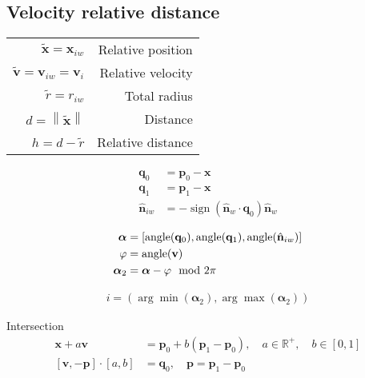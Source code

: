 \subsection{Velocity relative distance}

\begin{table}[H]
\centering
\begin{tabularx}{1.0\linewidth}{ R R }
\hline
\hline
$ \tilde{\mathbf{x}} = \mathbf{x}_{iw} $ & Relative position \\
$ \tilde{\mathbf{v}} = \mathbf{v}_{iw} = \mathbf{v}_{i} $ & Relative velocity \\
$ \tilde{r} = r_{iw} $ & Total radius \\
$ d = \left\|\tilde{\mathbf{x}}\right\| $ & Distance\\
$ h = d - \tilde{r} $ & Relative distance \\
\hline
\hline
\end{tabularx}
\end{table}


\begin{align}
\mathbf{q}_{0} &= \mathbf{p}_{0} - \mathbf{x} \\
\mathbf{q}_{1} &= \mathbf{p}_{1} - \mathbf{x} \\
\hat{\mathbf{n}}_{iw} &= - \operatorname{sign}(\hat{\mathbf{n}}_{w} \cdot \mathbf{q}_{0}) \hat{\mathbf{n}}_{w}
\end{align}


\begin{align}
\boldsymbol{\alpha} &= [\operatorname{angle}(\mathbf{q}_{0}), \operatorname{angle}(\mathbf{q}_{1}), \operatorname{angle}(\hat{\mathbf{n}}_{iw})] \\
\varphi &= \operatorname{angle}(\mathbf{v}) \\
\boldsymbol{\alpha}_{2} &= \boldsymbol{\alpha} - \varphi \mod{2 \pi}
\end{align}

\begin{align}
i = (\arg\min(\boldsymbol{\alpha}_{2}), \arg\max(\boldsymbol{\alpha}_{2}))
\end{align}

Intersection
\begin{align}
\mathbf{x} + a \mathbf{v} &= \mathbf{p}_0 + b (\mathbf{p}_1 - \mathbf{p}_0),\quad a \in \mathbb{R}^{+}, \quad b \in [0, 1]
\\
[\mathbf{v}, -\mathbf{p}] \cdot [a,  b] &= \mathbf{q}_0, \quad  \mathbf{p} = \mathbf{p}_1 - \mathbf{p}_0
\end{align}

